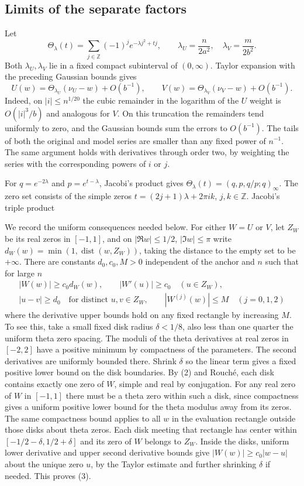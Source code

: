 \documentclass[11pt]{article}
\begin{document}
\subsection{Limits of the separate factors}

Let
\[
 \Theta_\lambda(t)=\sum_{j\in\mathbb Z}(-1)^j e^{-\lambda j^2+tj},\qquad
 \lambda_U=\frac{n}{2a^2},\quad \lambda_V=\frac{m}{2b^2}.
\]
Both $\lambda_U,\lambda_V$ lie in a fixed compact subinterval of $(0,\infty)$. Taylor expansion with the preceding Gaussian bounds gives
\[
 U(w)=\Theta_{\lambda_U}(\nu_U-w)+O(b^{-1}),\qquad
 V(w)=\Theta_{\lambda_V}(\nu_V-w)+O(b^{-1}).
 \tag{2}
\]
Indeed, on $|i|\le n^{1/20}$ the cubic remainder in the logarithm of the $U$ weight is $O(|i|^3/b)$ and analogous for $V$. On this truncation the remainders tend uniformly to zero, and the Gaussian bounds sum the errors to $O(b^{-1})$. The tails of both the original and model series are smaller than any fixed power of $n^{-1}$. The same argument holds with derivatives through order two, by weighting the series with the corresponding powers of $i$ or $j$.

For $q=e^{-2\lambda}$ and $p=e^{t-\lambda}$, Jacobi's product gives $\Theta_\lambda(t)=(q,p,q/p;q)_\infty$. The zero set consists of the simple zeros $t=(2j+1)\lambda+2\pi i k$, $j,k\in\mathbb Z$. Jacobi's triple product~\cite{DLMF}

We record the uniform consequences needed below. For either $W=U$ or $V$, let $Z_W$ be its real zeros in $[-1,1]$, and on $|\Re w|\le1/2$, $|\Im w|\le\pi$ write $d_W(w)=\min(1,\operatorname{dist}(w,Z_W))$, taking the distance to the empty set to be $+\infty$. There are constants $d_0,c_0,M>0$ independent of the anchor and $n$ such that for large $n$
\[
 \begin{gathered}
 |W(w)|\ge c_0 d_W(w),\qquad
 |W'(u)|\ge c_0\quad (u\in Z_W),\\
 |u-v|\ge d_0\quad\text{for distinct }u,v\in Z_W,\qquad
 |W^{(j)}(w)|\le M\quad(j=0,1,2)
 \tag{3}
 \end{gathered}
\]
where the derivative upper bounds hold on any fixed rectangle by increasing $M$. To see this, take a small fixed disk radius $\delta<1/8$, also less than one quarter the uniform theta zero spacing. The moduli of the theta derivatives at real zeros in $[-2,2]$ have a positive minimum by compactness of the parameters. The second derivatives are uniformly bounded there. Shrink $\delta$ so the linear term gives a fixed positive lower bound on the disk boundaries. By (2) and Rouché, each disk contains exactly one zero of $W$, simple and real by conjugation. For any real zero of $W$ in $[-1,1]$ there must be a theta zero within such a disk, since compactness gives a uniform positive lower bound for the theta modulus away from its zeros. The same compactness bound applies to all $w$ in the evaluation rectangle outside those disks about theta zeros. Each disk meeting that rectangle has center within $[-1/2-\delta,1/2+\delta]$ and its zero of $W$ belongs to $Z_W$. Inside the disks, uniform lower derivative and upper second derivative bounds give $|W(w)|\ge c_0|w-u|$ about the unique zero $u$, by the Taylor estimate and further shrinking $\delta$ if needed. This proves (3).
\end{document}
